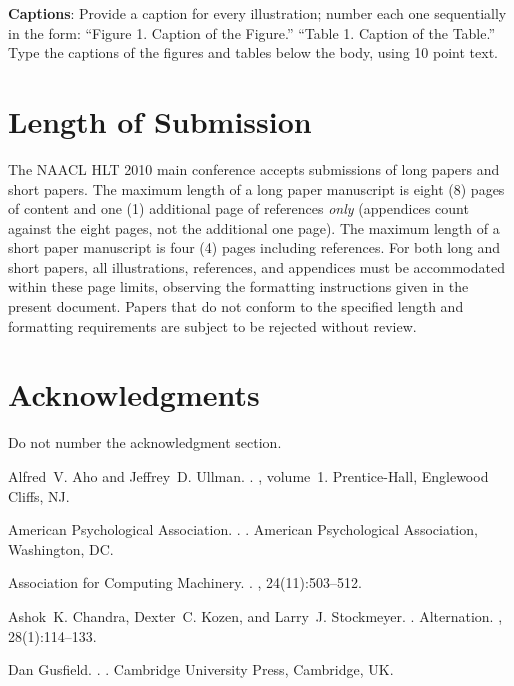 \documentclass[11pt,letterpaper]{article}
\begin{document}
{\bf Captions}: Provide a caption for every illustration; number each one
sequentially in the form:  ``Figure 1. Caption of the Figure.'' ``Table 1.
Caption of the Table.''  Type the captions of the figures and 
tables below the body, using 10 point text.  

\section{Length of Submission}
\label{sec:length}

The NAACL HLT 2010 main conference accepts submissions of long papers
and short papers.  The maximum length of a long paper manuscript is
eight (8) pages of content and one (1) additional page of references
\emph{only} (appendices count against the eight pages, not the
additional one page).  The maximum length of a short paper manuscript
is four (4) pages including references.  For both long and short
papers, all illustrations, references, and appendices must be
accommodated within these page limits, observing the formatting
instructions given in the present document.  Papers that do not
conform to the specified length and formatting requirements are
subject to be rejected without review.


\section*{Acknowledgments}

Do not number the acknowledgment section.

\begin{thebibliography}{}

Alfred~V. Aho and Jeffrey~D. Ullman.
.
, volume~1.
\newblock Prentice-{Hall}, Englewood Cliffs, NJ.

{American Psychological Association}.
.
.
\newblock American Psychological Association, Washington, DC.

{Association for Computing Machinery}.
.
, 24(11):503--512.

Ashok~K. Chandra, Dexter~C. Kozen, and Larry~J. Stockmeyer.
.
\newblock Alternation.
,
  28(1):114--133.

Dan Gusfield.
.
.
\newblock Cambridge University Press, Cambridge, UK.

\end{thebibliography}
\end{document}
